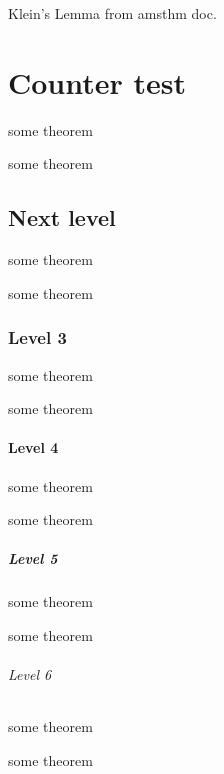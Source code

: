 \begin{KL}
Klein's Lemma from amsthm doc.
\end{KL}

\hypertarget{counter-test}{%
\chapter{Counter test}\label{counter-test}}

\begin{Theorem}
some theorem
\end{Theorem}

\begin{Theorem}
some theorem
\end{Theorem}

\hypertarget{next-level}{%
\section{Next level}\label{next-level}}

\begin{Theorem}
some theorem
\end{Theorem}

\begin{Theorem}
some theorem
\end{Theorem}

\hypertarget{level-3}{%
\subsection{Level 3}\label{level-3}}

\begin{Theorem}
some theorem
\end{Theorem}

\begin{Theorem}
some theorem
\end{Theorem}

\hypertarget{level-4}{%
\subsubsection{Level 4}\label{level-4}}

\begin{Theorem}
some theorem
\end{Theorem}

\begin{Theorem}
some theorem
\end{Theorem}

\hypertarget{level-5}{%
\paragraph{Level 5}\label{level-5}}

\begin{Theorem}
some theorem
\end{Theorem}

\begin{Theorem}
some theorem
\end{Theorem}

\hypertarget{level-6}{%
\subparagraph{Level 6}\label{level-6}}

\begin{Theorem}
some theorem
\end{Theorem}

\begin{Theorem}
some theorem
\end{Theorem}
